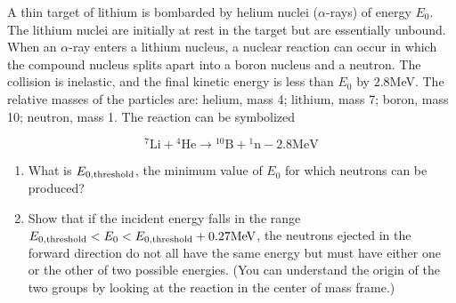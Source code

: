 \documentclass[12pt,letterpaper]{hmcpset}
\newcommand{\val}[2]{$#1$#2}
\begin{document}
\begin{problem}
    A thin target of lithium is bombarded
    by helium nuclei ($\alpha$-rays) of
    energy $E_{0}$. The lithium nuclei are
    initially at rest in the target but are
    essentially unbound. When an $\alpha$-ray
    enters a lithium nucleus, a nuclear reaction
    can occur in which the compound nucleus
    splits apart into a boron nucleus and a
    neutron. The collision is inelastic, and
    the final kinetic energy is less than $E_{0}$
    by \val{2.8}{MeV}. The relative masses of the
    particles are: helium, mass 4; lithium, mass 7;
    boron, mass 10; neutron, mass 1. The reaction
    can be symbolized

    \[
        {}^7\text{Li} + {}^4\text{He} \longrightarrow {}^{10}\text{B} + {}^1\text{n} - 2.8\text{MeV}
    \]

    \begin{enumerate}
    \item What is $E_{0,\rm threshold}$, the minimum value
        of $E_{0}$ for which neutrons can be produced?
    \item Show that if the incident energy falls in the
        range $E_{0,\rm threshold} < E_{0} <E_{0,\rm threshold}
        + 0.27\text{MeV}$, the neutrons ejected in the forward
        direction do not all have the same energy but must
        have either one or the other of two possible energies.
        (You can understand the origin of the two groups by
        looking at the reaction in the center of mass frame.)
    \end{enumerate}
\end{problem}

\begin{solution}
    \vfill
\end{solution}
\clearpage
\end{document}
